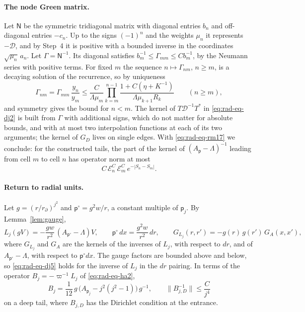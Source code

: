\paragraph{The node Green matrix.}
Let $\mathsf N$ be the symmetric tridiagonal matrix with diagonal
entries $b_n$ and off-diagonal entries $-c_n$. Up to the signs
$(-1)^n$ and the weights $\mu_n$ it represents $-\mathcal D$, and by
Step~4 it is positive with a bounded inverse in the coordinates
$\sqrt{\mu_n}\,a_n$. Let $\Gamma=\mathsf N^{-1}$. Its diagonal
satisfies $b_m^{-1}\le\Gamma_{mm}\le Cb_m^{-1}$, by the Neumann series
with positive terms. For fixed $m$ the sequence $n\mapsto\Gamma_{nm}$,
$n\ge m$, is a decaying solution of the recurrence, so by uniqueness
\begin{equation}\label{eq:rad-eq-dj4}
 \Gamma_{nm}=\Gamma_{mm}\,\frac{y_n}{y_m}
 \le\frac{C}{\Lambda\mu_m}
      \prod_{k=m}^{n-1}\frac{1+C(\eta+K^{-1})}{\Lambda\mu_{k+1}R_k}
 \qquad(n\ge m),
\end{equation}
and symmetry gives the bound for $n<m$. The kernel of
$T\mathcal D^{-1}T^*$ in \eqref{eq:rad-eq-dj2} is built from $\Gamma$
with additional signs, which do not matter for absolute bounds, and
with at most two interpolation functions at each of its two
arguments; the kernel of $G_D$ lives on single edges. With
\eqref{eq:rad-eq-rm17} we conclude: for the constructed tails, the
part of the kernel of $(A_{\mathsf p}-\Lambda)^{-1}$ leading from cell
$m$ to cell $n$ has operator norm at most
\begin{equation}\label{eq:rad-eq-dj5}
 C\,\mathcal E_n^C\,\mathcal E_m^C\,e^{-|S_n-S_m|}.
\end{equation}

\paragraph{Return to radial units.}
Let $g=(r/r_\partial)^{j^2}$ and $\mathsf p^\circ=g^2w/r$, a constant
multiple of $\mathsf p_j$. By Lemma~\ref{lem:gauge},
\[
 L_j(gV)=-\frac{gw}{r^2}\,(A_{\mathsf p^\circ}-\Lambda)V,
 \qquad \mathsf p^\circ\,dx=\frac{g^2w}{r^2}\,dr,
 \qquad G_{L_j}(r,r')=-g(r)\,g(r')\,G_A(x,x'),
\]
where $G_{L_j}$ and $G_A$ are the kernels of the inverses of $L_j$,
with respect to $dr$, and of $A_{\mathsf p^\circ}-\Lambda$, with
respect to $\mathsf p^\circ dx$. The gauge factors are bounded above
and below, so \eqref{eq:rad-eq-dj5} holds for the inverse of $L_j$ in
the $dr$ pairing. In terms of the operator $B_j=-\varpi^{-1}L_j$ of
\eqref{eq:rad-eq-ha2},
\begin{equation}\label{eq:rad-eq-rm20}
 B_j=\frac1{12}\,g\,\bigl(A_{\mathsf p_j}-j^2(j^2-1)\bigr)\,g^{-1},
 \qquad \|B_{j,D}^{-1}\|\le\frac{C}{j^{4}}
\end{equation}
on a deep tail, where $B_{j,D}$ has the Dirichlet condition at the
entrance.

